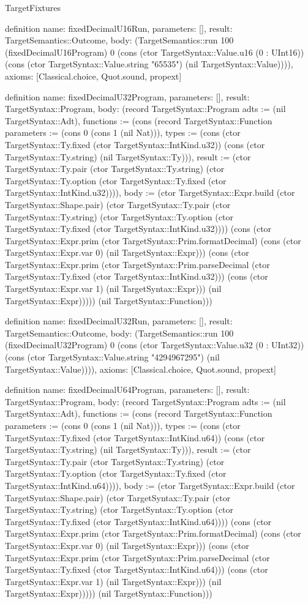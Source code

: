 \begin{lexlean}{TargetFixtures}
\begin{semanticmodule}
definition{
  name: fixedDecimalU16Run,
  parameters: [],
  result: TargetSemantics::Outcome,
  body: (TargetSemantics::run 100 (fixedDecimalU16Program) 0 (cons (ctor TargetSyntax::Value.u16 (0 : UInt16)) (cons (ctor TargetSyntax::Value.string "65535") (nil TargetSyntax::Value)))),
  axioms: [Classical.choice, Quot.sound, propext]
}

definition{
  name: fixedDecimalU32Program,
  parameters: [],
  result: TargetSyntax::Program,
  body: (record TargetSyntax::Program {adts := (nil TargetSyntax::Adt), functions := (cons (record TargetSyntax::Function {parameters := (cons 0 (cons 1 (nil Nat))), types := (cons (ctor TargetSyntax::Ty.fixed (ctor TargetSyntax::IntKind.u32)) (cons (ctor TargetSyntax::Ty.string) (nil TargetSyntax::Ty))), result := (ctor TargetSyntax::Ty.pair (ctor TargetSyntax::Ty.string) (ctor TargetSyntax::Ty.option (ctor TargetSyntax::Ty.fixed (ctor TargetSyntax::IntKind.u32)))), body := (ctor TargetSyntax::Expr.build (ctor TargetSyntax::Shape.pair) (ctor TargetSyntax::Ty.pair (ctor TargetSyntax::Ty.string) (ctor TargetSyntax::Ty.option (ctor TargetSyntax::Ty.fixed (ctor TargetSyntax::IntKind.u32)))) (cons (ctor TargetSyntax::Expr.prim (ctor TargetSyntax::Prim.formatDecimal) (cons (ctor TargetSyntax::Expr.var 0) (nil TargetSyntax::Expr))) (cons (ctor TargetSyntax::Expr.prim (ctor TargetSyntax::Prim.parseDecimal (ctor TargetSyntax::Ty.fixed (ctor TargetSyntax::IntKind.u32))) (cons (ctor TargetSyntax::Expr.var 1) (nil TargetSyntax::Expr))) (nil TargetSyntax::Expr))))}) (nil TargetSyntax::Function))})
}

definition{
  name: fixedDecimalU32Run,
  parameters: [],
  result: TargetSemantics::Outcome,
  body: (TargetSemantics::run 100 (fixedDecimalU32Program) 0 (cons (ctor TargetSyntax::Value.u32 (0 : UInt32)) (cons (ctor TargetSyntax::Value.string "4294967295") (nil TargetSyntax::Value)))),
  axioms: [Classical.choice, Quot.sound, propext]
}

definition{
  name: fixedDecimalU64Program,
  parameters: [],
  result: TargetSyntax::Program,
  body: (record TargetSyntax::Program {adts := (nil TargetSyntax::Adt), functions := (cons (record TargetSyntax::Function {parameters := (cons 0 (cons 1 (nil Nat))), types := (cons (ctor TargetSyntax::Ty.fixed (ctor TargetSyntax::IntKind.u64)) (cons (ctor TargetSyntax::Ty.string) (nil TargetSyntax::Ty))), result := (ctor TargetSyntax::Ty.pair (ctor TargetSyntax::Ty.string) (ctor TargetSyntax::Ty.option (ctor TargetSyntax::Ty.fixed (ctor TargetSyntax::IntKind.u64)))), body := (ctor TargetSyntax::Expr.build (ctor TargetSyntax::Shape.pair) (ctor TargetSyntax::Ty.pair (ctor TargetSyntax::Ty.string) (ctor TargetSyntax::Ty.option (ctor TargetSyntax::Ty.fixed (ctor TargetSyntax::IntKind.u64)))) (cons (ctor TargetSyntax::Expr.prim (ctor TargetSyntax::Prim.formatDecimal) (cons (ctor TargetSyntax::Expr.var 0) (nil TargetSyntax::Expr))) (cons (ctor TargetSyntax::Expr.prim (ctor TargetSyntax::Prim.parseDecimal (ctor TargetSyntax::Ty.fixed (ctor TargetSyntax::IntKind.u64))) (cons (ctor TargetSyntax::Expr.var 1) (nil TargetSyntax::Expr))) (nil TargetSyntax::Expr))))}) (nil TargetSyntax::Function))})
}


\end{semanticmodule}
\end{lexlean}

